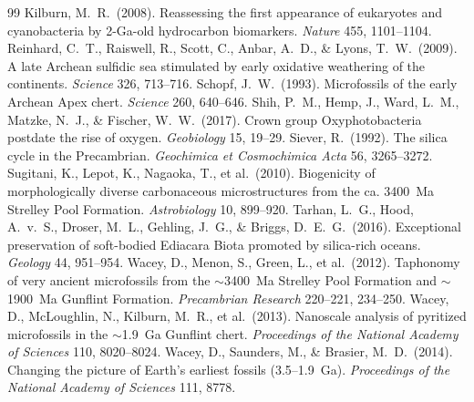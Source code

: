 \documentclass[11pt]{article}
\begin{document}
\begin{thebibliography}{99}
Kilburn, M.~R.\ (2008). Reassessing the first appearance of eukaryotes and cyanobacteria by
2-Ga-old hydrocarbon biomarkers. \textit{Nature} 455, 1101--1104.
 Reinhard, C.~T., Raiswell, R., Scott, C., Anbar, A.~D.,
\& Lyons, T.~W.\ (2009). A late Archean sulfidic sea stimulated by early oxidative weathering of the
continents. \textit{Science} 326, 713--716.
 Schopf, J.~W.\ (1993). Microfossils of the early Archean Apex
chert. \textit{Science} 260, 640--646.
 Shih, P.~M., Hemp, J., Ward, L.~M., Matzke, N.~J., \& Fischer,
W.~W.\ (2017). Crown group Oxyphotobacteria postdate the rise of oxygen. \textit{Geobiology} 15,
19--29.
 Siever, R.\ (1992). The silica cycle in the Precambrian.
\textit{Geochimica et Cosmochimica Acta} 56, 3265--3272.
 Sugitani, K., Lepot, K., Nagaoka, T., et al.\ (2010).
Biogenicity of morphologically diverse carbonaceous microstructures from the ca. 3400~Ma Strelley
Pool Formation. \textit{Astrobiology} 10, 899--920.
 Tarhan, L.~G., Hood, A.~v.~S., Droser, M.~L., Gehling, J.~G.,
\& Briggs, D.~E.~G.\ (2016). Exceptional preservation of soft-bodied Ediacara Biota promoted by
silica-rich oceans. \textit{Geology} 44, 951--954.
 Wacey, D., Menon, S., Green, L., et al.\ (2012). Taphonomy of
very ancient microfossils from the $\sim$3400~Ma Strelley Pool Formation and $\sim$1900~Ma Gunflint
Formation. \textit{Precambrian Research} 220--221, 234--250.
 Wacey, D., McLoughlin, N., Kilburn, M.~R., et al.\ (2013).
Nanoscale analysis of pyritized microfossils in the $\sim$1.9~Ga Gunflint chert. \textit{Proceedings
of the National Academy of Sciences} 110, 8020--8024.
 Wacey, D., Saunders, M., \& Brasier, M.~D.\ (2014).
Changing the picture of Earth's earliest fossils (3.5--1.9~Ga). \textit{Proceedings of the National
Academy of Sciences} 111, 8778.
\end{thebibliography}
\end{document}
